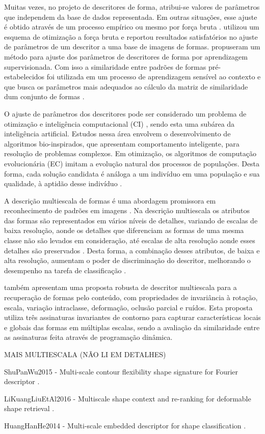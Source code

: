 Muitas vezes, no projeto de descritores de forma, atribui-se valores de parâmetros que independem da base de dados representada. Em outras situações, esse ajuste é obtido através de um processo empírico ou mesmo por força bruta \cite{mokhtarian1998robust, Ling:2007:SCU:1191552.1191806, Wang2012134}.  utilizou um esquema de otimização a força bruta e reportou resultados satisfatórios no ajuste de parâmetros de um descritor a uma base de imagens de formas.   propuseram um método para ajuste dos parâmetros de descritores de forma por aprendizagem supervisionada. Com isso a similaridade entre padrões de formas pré-estabelecidos foi utilizada em um processo de aprendizagem sensível ao contexto e que busca os parâmetros mais adequados ao cálculo da matriz de similaridade dum conjunto de formas \cite{4815272}.

O ajuste de parâmetros dos descritores pode ser considerado um problema de otimização e inteligência computacional (CI) \cite{Andries:2007}, sendo esta uma subárea da inteligência artificial. Estudos nessa área envolvem o desenvolvimento de algoritmos bio-inspirados, que apresentam comportamento inteligente, para resolução de problemas complexos. Em otimização, os algoritmos de computação evolucionária (EC) imitam a evolução natural dos processos de populações. Desta forma, cada solução candidata é análoga a um indivíduo em uma população e sua qualidade, à aptidão desse indivíduo \cite{Eiben:2015}.


A descrição multiescala de formas \cite{Costa:2009} é uma abordagem promissora em reconhecimento de padrões em imagens \cite{Direkoglu:2011}. Na descrição multiescala os atributos das formas são representados em vários níveis de detalhes, variando de escalas de baixa resolução, aonde os detalhes que diferenciam as formas de uma mesma classe não são levados em consideração, até escalas de alta resolução aonde esses detalhes são preservados \cite{Ullman:1996}. Desta forma, a combinação desses atributos, de baixa e alta resolução, aumentam o poder de discriminação do descritor, melhorando o desempenho na tarefa de classificação \cite{Direkoglu:2011}.

 também apresentam uma proposta robusta de descritor multiescala para a recuperação de formas pelo conteúdo, com propriedades de invariância à rotação, escala, variação intraclasse, deformação,  oclusão parcial e ruídos. Esta proposta utiliza três assinaturas invariantes de contorno para capturar características locais e globais das formas em múltiplas escalas, sendo a avaliação da similaridade entre as assinaturas feita através de programação dinâmica.
{\color{blue}
MAIS MULTIESCALA (NÃO LI EM DETALHES)

ShuPanWu2015 - Multi-scale contour flexibility shape signature for Fourier descriptor
 \cite{ShuPanWu2015}.

LiKuangLiuEtAl2016 - Multiscale shape context and re-ranking for deformable shape retrieval
 \cite{LiKuangLiuEtAl2016}.

HuangHanHe2014 - Multi-scale embedded descriptor for shape classification
\cite{HuangHanHe2014}.
}


